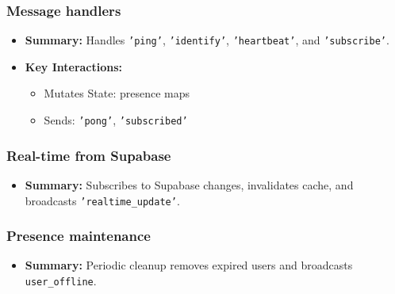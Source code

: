 \documentclass[11pt,letterpaper]{article}
\begin{document}
\subsubsection{Message handlers}
\begin{itemize}
    \item \textbf{Summary:} Handles \texttt{'ping'}, \texttt{'identify'}, \texttt{'heartbeat'}, and \texttt{'subscribe'}.
    \item \textbf{Key Interactions:}
    \begin{itemize}
        \item Mutates State: presence maps
        \item Sends: \texttt{'pong'}, \texttt{'subscribed'}
    \end{itemize}
\end{itemize}

\subsubsection{Real-time from Supabase}
\begin{itemize}
    \item \textbf{Summary:} Subscribes to Supabase changes, invalidates cache, and broadcasts \texttt{'realtime\_update'}.
\end{itemize}

\subsubsection{Presence maintenance}
\begin{itemize}
    \item \textbf{Summary:} Periodic cleanup removes expired users and broadcasts \texttt{user\_offline}.
\end{itemize}
\end{document}
